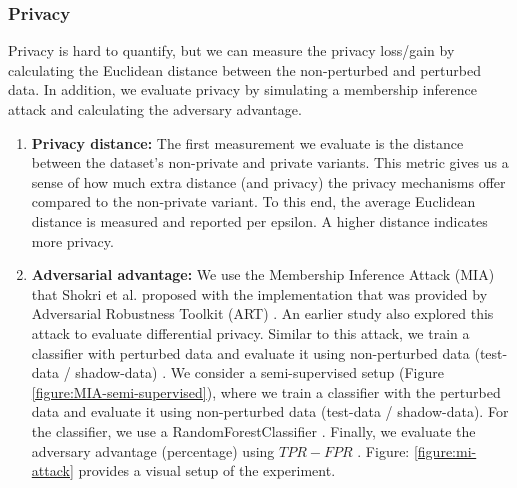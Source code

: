 \subsubsection{Privacy}
Privacy is hard to quantify, but we can measure the privacy loss/gain by calculating the Euclidean distance between the non-perturbed and perturbed data.
In addition, we evaluate privacy by simulating a membership inference attack and calculating the adversary advantage.
\begin{enumerate}
      \item \textbf{Privacy distance: }
            The first measurement we evaluate is the distance between the dataset's non-private and private variants.
            This metric gives us a sense of how much extra distance (and privacy) the privacy mechanisms offer compared to the non-private variant.
            To this end, the average Euclidean distance is measured and reported per epsilon. A higher distance indicates more privacy.
      \item \textbf{Adversarial advantage: }
            We use the Membership Inference Attack (MIA) that Shokri et al. proposed with the implementation that was provided by Adversarial Robustness Toolkit (ART) \citep{nicolae_adversarial_2019}.
            An earlier study also explored this attack to evaluate differential privacy.
            Similar to this attack, we train a classifier with perturbed data and evaluate it using non-perturbed data (test-data / shadow-data) \citep{zhao_not_2020}.
            We consider a semi-supervised setup (Figure \ref{figure:MIA-semi-supervised}), where we train a classifier with the perturbed data and evaluate it using non-perturbed data (test-data / shadow-data).
            For the classifier, we use a RandomForestClassifier \citep{rigaki_survey_2021}.
            Finally, we evaluate the adversary advantage (percentage) using $TPR - FPR$ \citep{yeom_privacy_2018}.
            Figure: \ref{figure:mi-attack} provides a visual setup of the experiment.


\end{enumerate}
